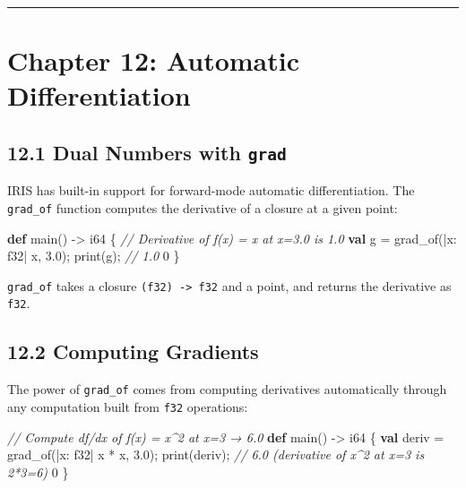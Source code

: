 \documentclass[
  english,
]{book}
\newenvironment{Shaded}{\begin{snugshade}}{\end{snugshade}}
\newcommand{\CommentTok}[1]{\textcolor[rgb]{0.42,0.60,0.33}{\textit{#1}}}
\newcommand{\DataTypeTok}[1]{\textcolor[rgb]{0.31,0.79,0.69}{#1}}
\newcommand{\DecValTok}[1]{\textcolor[rgb]{0.71,0.81,0.66}{#1}}
\newcommand{\FloatTok}[1]{\textcolor[rgb]{0.71,0.81,0.66}{#1}}
\newcommand{\FunctionTok}[1]{\textcolor[rgb]{0.86,0.86,0.67}{#1}}
\newcommand{\KeywordTok}[1]{\textcolor[rgb]{0.34,0.61,0.84}{\textbf{#1}}}
\newcommand{\NormalTok}[1]{\textcolor[rgb]{0.83,0.83,0.83}{#1}}
\newcommand{\OperatorTok}[1]{\textcolor[rgb]{0.83,0.83,0.83}{#1}}
\begin{document}
\begin{center}\rule{0.5\linewidth}{0.5pt}\end{center}

\section{Chapter 12: Automatic
Differentiation}\label{chapter-12-automatic-differentiation}

\subsection{\texorpdfstring{12.1 Dual Numbers with
\texttt{grad}}{12.1 Dual Numbers with grad}}\label{dual-numbers-with-grad}

IRIS has built-in support for forward-mode automatic differentiation.
The \texttt{grad\_of} function computes the derivative of a closure at a
given point:

\begin{Shaded}
\begin{Highlighting}[]
\KeywordTok{def}\NormalTok{ main() }\OperatorTok{{-}\textgreater{}} \DataTypeTok{i64}\NormalTok{ \{}
    \CommentTok{// Derivative of f(x) = x at x=3.0 is 1.0}
    \KeywordTok{val}\NormalTok{ g }\OperatorTok{=}\NormalTok{ grad\_of(}\OperatorTok{|}\NormalTok{x: }\DataTypeTok{f32}\OperatorTok{|}\NormalTok{ x, }\FloatTok{3.0}\NormalTok{);}
    \FunctionTok{print}\NormalTok{(g);   }\CommentTok{// 1.0}
    \DecValTok{0}
\NormalTok{\}}
\end{Highlighting}
\end{Shaded}

\texttt{grad\_of} takes a closure \texttt{(f32)\ -\textgreater{}\ f32}
and a point, and returns the derivative as \texttt{f32}.

\subsection{12.2 Computing Gradients}\label{computing-gradients}

The power of \texttt{grad\_of} comes from computing derivatives
automatically through any computation built from \texttt{f32}
operations:

\begin{Shaded}
\begin{Highlighting}[]
\CommentTok{// Compute df/dx of f(x) = x\^{}2 at x=3 → 6.0}
\KeywordTok{def}\NormalTok{ main() }\OperatorTok{{-}\textgreater{}} \DataTypeTok{i64}\NormalTok{ \{}
    \KeywordTok{val}\NormalTok{ deriv }\OperatorTok{=}\NormalTok{ grad\_of(}\OperatorTok{|}\NormalTok{x: }\DataTypeTok{f32}\OperatorTok{|}\NormalTok{ x }\OperatorTok{*}\NormalTok{ x, }\FloatTok{3.0}\NormalTok{);}
    \FunctionTok{print}\NormalTok{(deriv);    }\CommentTok{// 6.0 (derivative of x\^{}2 at x=3 is 2*3=6)}
    \DecValTok{0}
\NormalTok{\}}
\end{Highlighting}
\end{Shaded}
\end{document}
